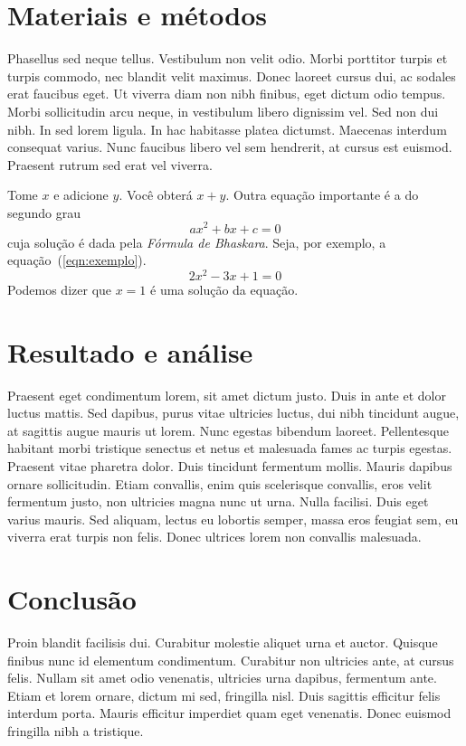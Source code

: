 \documentclass{article}
\begin{document}
\section{Materiais e métodos}

Phasellus sed neque tellus. Vestibulum non velit odio. Morbi porttitor turpis et turpis commodo, nec blandit velit maximus. Donec laoreet cursus dui, ac sodales erat faucibus eget. Ut viverra diam non nibh finibus, eget dictum odio tempus. Morbi sollicitudin arcu neque, in vestibulum libero dignissim vel. Sed non dui nibh. In sed lorem ligula. In hac habitasse platea dictumst. Maecenas interdum consequat varius. Nunc faucibus libero vel sem hendrerit, at cursus est euismod. Praesent rutrum sed erat vel viverra. 


Tome $x$ e adicione $y$. Você obterá $x+y$.
Outra equação importante é a do segundo grau
\[ax^2+bx+c=0\] cuja solução é dada pela
\emph{Fórmula de Bhaskara}.
Seja, por exemplo, a equação~(\ref{eqn:exemplo}).
\begin{equation}
	2x^2-3x+1=0
	\label{eqn:exemplo}
\end{equation}
Podemos dizer que $x=1$ é uma solução da equação.

\section{Resultado e análise}

Praesent eget condimentum lorem, sit amet dictum justo. Duis in ante et dolor luctus mattis. Sed dapibus, purus vitae ultricies luctus, dui nibh tincidunt augue, at sagittis augue mauris ut lorem. Nunc egestas bibendum laoreet. Pellentesque habitant morbi tristique senectus et netus et malesuada fames ac turpis egestas. Praesent vitae pharetra dolor. Duis tincidunt fermentum mollis. Mauris dapibus ornare sollicitudin. Etiam convallis, enim quis scelerisque convallis, eros velit fermentum justo, non ultricies magna nunc ut urna. Nulla facilisi. Duis eget varius mauris. Sed aliquam, lectus eu lobortis semper, massa eros feugiat sem, eu viverra erat turpis non felis. Donec ultrices lorem non convallis malesuada.


\section{Conclusão}

Proin blandit facilisis dui. Curabitur molestie aliquet urna et auctor. Quisque finibus nunc id elementum condimentum. Curabitur non ultricies ante, at cursus felis. Nullam sit amet odio venenatis, ultricies urna dapibus, fermentum ante. Etiam et lorem ornare, dictum mi sed, fringilla nisl. Duis sagittis efficitur felis interdum porta. Mauris efficitur imperdiet quam eget venenatis. Donec euismod fringilla nibh a tristique.
\end{document}
